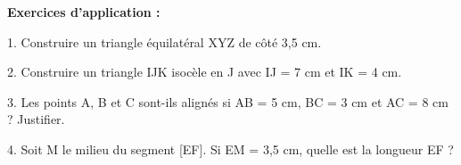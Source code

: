 \textbf{Exercices d'application :}

\begin{exercisebox}
	1. Construire un triangle équilatéral XYZ de côté 3,5 cm.
	
	\vspace{4cm}
	
	2. Construire un triangle IJK isocèle en J avec IJ = 7 cm et IK = 4 cm.
	
	\vspace{4cm}
	
	3. Les points A, B et C sont-ils alignés si AB = 5 cm, BC = 3 cm et AC = 8 cm ? Justifier.
	
	\trous{8cm}
	
	\trous{8cm}
	
	4. Soit M le milieu du segment [EF]. Si EM = 3,5 cm, quelle est la longueur EF ?
	
	\trous{8cm}
\end{exercisebox}